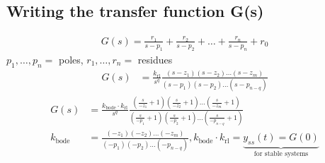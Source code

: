 \subsection{Writing the transfer function G(s)}
        \begin{align*}
            G(s) = \frac{r_1}{s-p_1} + \frac{r_2}{s-p_2} + \ldots + \frac{r_n}{s-p_n} + r_0
        \end{align*}
        $p_1, \ldots, p_n =$ poles, $r_1, \ldots, r_n =$ residues
        \begin{align*}
            G(s) &= \frac{k_{\text{rl}}}{s^q} \frac{(s-z_1)(s-z_2) \dots (s-z_m)}{(s-p_1)(s-p_2) \dots (s-p_{n-q})}
        \end{align*}
        \begin{align*}
            G(s) &= \frac{k_{\text{bode}} \cdot k_{\text{rl}}}{s^q} \frac{(\frac{s}{-z_1} + 1)(\frac{s}{-z_2} + 1) \dots (\frac{s}{-z_m} + 1)}{(\frac{s}{-p_1} + 1)(\frac{s}{-p_2} + 1) \dots (\frac{s}{-p_{n-q}} + 1)}\\
            k_{\text{bode}} &= \frac{(-z_1)(-z_2) \dots (-z_m)}{(-p_1)(-p_2) \dots (-p_{n-q})}, k_{\text{bode}} \cdot k_{\text{rl}} = \underbrace{y_{ss}(t) = G(0)}_{\text{for stable systems}}
        \end{align*}